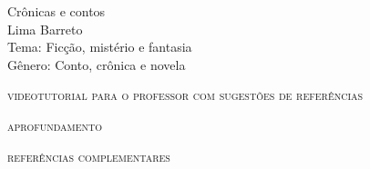 \documentclass[smaller,professionalfonts,15pt]{beamer}
\begin{document}

										\begin{frame}\begin{raggedleft}
										\Huge 
Crônicas e contos						\\
										\huge 
Lima Barreto							\\
										\bigskip
										\normalsize
Tema: Ficção, mistério e fantasia		\\	
Gênero: Conto, crônica e novela			\\\vfill\hfill
\publishername
										\end{raggedleft}

\end{frame}


\begin{frame}{\textsc{videotutorial para o professor com sugestões de referências}}
\vspace{-2cm}\begin{figure}
\end{figure}
\end{frame}

\begin{frame}
\hfill\Huge
\textsc{aprofundamento}
\end{frame}


\begin{frame}
\hfill\Huge
\textsc{referências complementares}
\end{frame}
\end{document}
